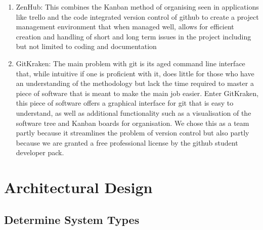 \documentclass[11pt]{article}
\begin{document}
\begin{enumerate}
\begin{enumerate}
		\item ZenHub: This combines the Kanban method of organising seen in applications like trello and the code integrated version control of github to create a project management environment that when managed well, allows for efficient creation and handling of short and long term issues in the project including but not limited to coding and documentation
		\item GitKraken: The main problem with git is its aged command line interface that, while intuitive if one is proficient with it, does little for those who have an understanding of the methodology but lack the time required to master a piece of software that is meant to make the main job easier. Enter GitKraken, this piece of software offers a graphical interface for git that is easy to understand, as well as additional functionality such as a visualisation of the software tree and Kanban boards for organisation. We chose this as a team partly because it streamlines the problem of version control but also partly because we are granted a free professional license by the github student developer pack.
	\end{enumerate}
\end{enumerate}


\section{Architectural Design}

\subsection{Determine System Types}
\end{document}

